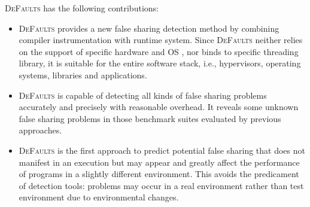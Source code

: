 \documentclass[10pt]{sigplanconf}
\newcommand{\Defaults}{{\scshape DeFaults}}
\newcommand{\defaults}{{\scshape DeFaults}}
\begin{document}
\Defaults{} has the following contributions:
\begin{itemize}
\item
\defaults{} provides a new false sharing detection method by
combining compiler instrumentation with runtime system.
Since \defaults{} neither relies on the support of specific hardware and OS ,
nor binds to specific threading library, 
it is suitable for the entire software stack, 
i.e., hypervisors, operating systems, libraries and applications. 

\item
\defaults{} is capable of detecting all kinds of false sharing problems accurately and precisely 
with reasonable overhead. 
It reveals some unknown false sharing problems in those benchmark suites evaluated by 
previous approaches. 

\item
\defaults{} is the first approach to predict potential false sharing that does
not manifest in an execution but may appear and greatly affect the performance of programs in a slightly different 
environment. 
This avoids the predicament of detection tools: problems may occur in a real
environment rather than test environment due to environmental changes. 


\end{itemize}
\end{document}
